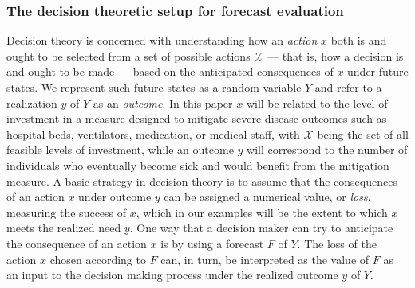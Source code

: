 \documentclass{article}\usepackage[]{graphicx}\usepackage[]{xcolor}
\begin{document}
\subsubsection{The decision theoretic setup for forecast evaluation}
\label{sec:methods.detailed.decisiontheory}


Decision theory is concerned with understanding how an \emph{action} $x$ both is and ought to be selected from a set of
possible actions $\mathcal{X}$ --- that is, how a decision is and ought to be made --- based on the anticipated
consequences of $x$ under future states. We represent such future states as a random variable $Y$ and refer to a
realization $y$ of $Y$ as an \emph{outcome}. In this paper $x$ will be related to the level of investment in a measure
designed to mitigate severe disease outcomes such as hospital beds, ventilators, medication, or medical staff, with
$\mathcal{X}$ being the set of all feasible levels of investment, while an outcome $y$ will correspond to the number of
individuals who eventually become sick and would benefit from the mitigation measure. A basic strategy in decision
theory is to assume that the consequences of an action $x$ under outcome $y$ can be assigned a numerical value, or
\emph{loss}, measuring the success of $x$, which in our examples will be the extent to which $x$ meets the realized need
$y$.  One way that a decision maker can try to anticipate the consequence of an action $x$ is by using a forecast $F$ of
$Y$. The loss of the action $x$ chosen according to $F$ can, in turn, be interpreted as the value of $F$ as an input to
the decision making process under the realized outcome $y$ of $Y$.
\end{document}
